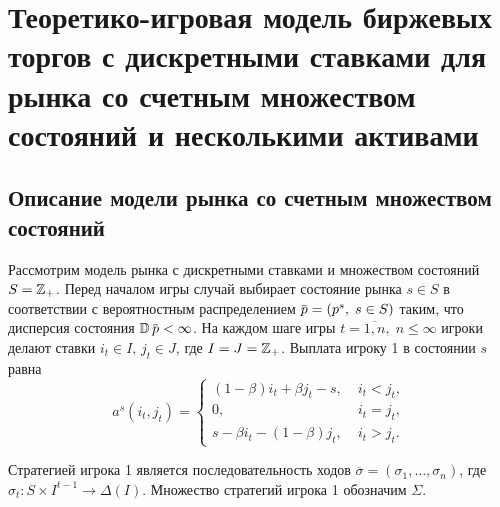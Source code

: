\chapter{Теоретико-игровая модель биржевых торгов с дискретными ставками для
  рынка со счетным множеством состояний и несколькими активами} \label{chapt3}
{
\newcommand{\s}{\ensuremath{s}}
\newcommand{\q}{\ensuremath{\overbar{q}}}
\newcommand{\theGame}[1][n]{\ensuremath{G_{#1}}}
\newcommand{\K}[1][n]{\ensuremath{K_{#1}}}
\newcommand{\V}[1][n]{\ensuremath{V_{#1}}}
\newcommand{\High}[1][\ensuremath{\infty}]{\ensuremath{H_{#1}}}
\newcommand{\sigmav}{\ensuremath{\overbar{\sigma}}}
\newcommand{\tauv}{\ensuremath{\overbar{\tau}}}
\newcommand{\sigmak}{\ensuremath{\hat{\sigma}}}
\newcommand{\Low}[1][\ensuremath{\infty}]{\ensuremath{L_{#1}}}


\section{Описание модели рынка со счетным множеством состояний}

Рассмотрим модель рынка с дискретными ставками и множеством состояний $S = \mathbb{Z}_+$.
Перед началом игры случай выбирает состояние рынка $\s \in S$ в соответствии с вероятностным распределением $\p = (p^s, \; s \in S)$ таким, что дисперсия состояния $\D \p < \infty$.
На каждом шаге игры $t = \overline{1,n}, \; n \leqslant \infty$ игроки делают ставки $i_t \in I, \, j_t \in J$, где $I = J = \mathbb{Z}_+$.
Выплата игроку 1 в состоянии $s$ равна
\begin{equation*}
  a^s(i_t, j_t) =
  \begin{cases}
    (1-\beta) i_t + \beta j_t - s, &\; i_t < j_t, \\
    0, &\; i_t = j_t, \\
    s - \beta i_t - (1-\beta)j_t, &\; i_t > j_t.
  \end{cases}
\end{equation*}

Стратегией игрока 1 является последовательность ходов $\sigmav = (\sigma_1, \ldots, \sigma_n)$, где $\sigma_t: S \times I^{t-1} \rightarrow \Delta(I)$.
Множество стратегий игрока 1 обозначим $\Sigma$.

}
